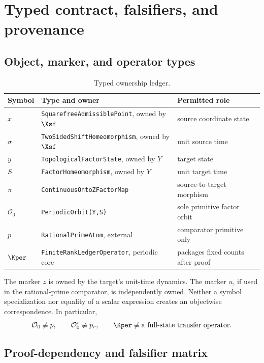 \section{Typed contract, falsifiers, and provenance}
\label{app:types-provenance}

\subsection{Object, marker, and operator types}

\begin{table}[H]
\centering
\small
\caption{Typed ownership ledger.}
\label{tab:type-ledger}
\begin{tabularx}{\textwidth}{@{}l>{\raggedright\arraybackslash}X
  >{\raggedright\arraybackslash}X@{}}
\toprule
Symbol & Type and owner & Permitted role \\
\midrule
\(x\) & \texttt{SquarefreeAdmissiblePoint}, owned by \(\Xsf\)
  & source coordinate state \\
\(\sigma\) & \texttt{TwoSidedShiftHomeomorphism}, owned by \(\Xsf\)
  & unit source time \\
\(y\) & \texttt{TopologicalFactorState}, owned by \(Y\)
  & target state \\
\(S\) & \texttt{FactorHomeomorphism}, owned by \(Y\)
  & unit target time \\
\(\pi\) & \texttt{ContinuousOntoZFactorMap}
  & source-to-target morphism \\
\(\mathcal O_0\) & \texttt{PeriodicOrbit(Y,S)}
  & sole primitive factor orbit \\
\(p\) & \texttt{RationalPrimeAtom}, external
  & comparator primitive only \\
\(\Kper\) & \texttt{FiniteRankLedgerOperator}, periodic core
  & packages fixed counts after proof \\
\bottomrule
\end{tabularx}
\end{table}

The marker \(z\) is owned by the target's unit-time dynamics.  The marker
\(u\), if used in the rational-prime comparator, is independently owned.
Neither a symbol specialization nor equality of a scalar expression creates
an objectwise correspondence.  In particular,
\[
  \mathcal O_0\not\equiv p,
  \qquad
  \mathcal O_0^r\not\equiv p_r,
  \qquad
  \Kper\not\equiv\text{a full-state transfer operator}.
\]

\Needspace{0.48\textheight}
\subsection{Proof-dependency and falsifier matrix}

